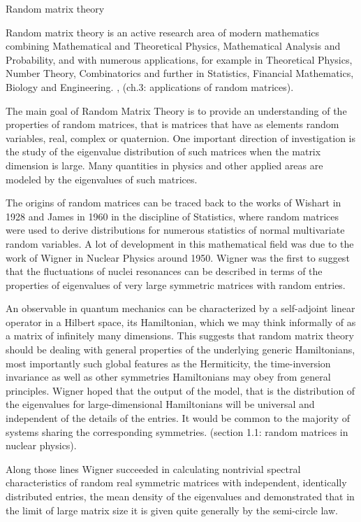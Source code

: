 \documentclass[11pt, a4paper, oneside]{book}
\numberwithin{equation}{chapter}
\begin{document}
\begin{section}{Random matrix theory}

Random matrix theory is an active research area of modern mathematics combining Mathematical and Theoretical Physics, Mathematical Analysis and Probability, and with numerous applications, for example in Theoretical Physics, Number Theory, Combinatorics and further in Statistics, Financial Mathematics, Biology and Engineering. \cite{akemann2011oxford}, (ch.3: applications of random matrices).

The main goal of Random Matrix Theory is to provide an understanding of the properties of random matrices, that is matrices that have as elements random variables, real, complex or quaternion. One important direction of investigation is the study of the eigenvalue distribution of such matrices when the matrix dimension is large. Many quantities in physics and other applied areas are modeled by the eigenvalues of such matrices. 

The origins of random matrices can be traced back to the works of Wishart in 1928 and James in 1960 in the discipline of Statistics, where random matrices were used to derive distributions for numerous statistics of normal multivariate random variables. A lot of development in this mathematical field was due to the work of Wigner in Nuclear Physics around 1950. Wigner was the first to suggest that the fluctuations of nuclei resonances can be described in terms of the properties of eigenvalues of very large symmetric matrices with random entries. 

An observable in quantum mechanics can be characterized by a self-adjoint linear operator in a Hilbert space, its Hamiltonian, which we may think informally of as a matrix of infinitely many dimensions. This suggests that random matrix theory should be dealing with general properties of the underlying generic Hamiltonians, most importantly such global features as the Hermiticity, the time-inversion invariance as well as other symmetries Hamiltonians may obey from general principles. Wigner hoped that the output of the model, that is the distribution of the eigenvalues for large-dimensional Hamiltonians will be universal and independent of the details of the entries. It would be common to the majority of systems sharing the corresponding symmetries. \cite{mehta2004random} (section 1.1: random matrices in nuclear physics). 

Along those lines Wigner succeeded in calculating nontrivial spectral characteristics of random real symmetric matrices with independent, identically distributed entries, the mean density of the eigenvalues and demonstrated that in the limit of large matrix size it is given quite generally by the semi-circle law. 
\end{section}
\end{document}
